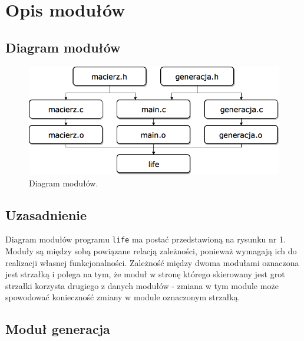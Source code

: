 \documentclass[a4paper,12pt,oneside]{article}
\begin{document}
\section{Opis modułów}

\subsection{Diagram modułów}

\begin{figure}[ht]
\centering
\includegraphics[width=1.0\textwidth]{diagram_modulow.png}
\caption{Diagram modułów.}
\label{fig:k1}
\end{figure}

\subsection{Uzasadnienie}
Diagram modułów programu \verb+life+ ma postać przedstawioną na rysunku nr 1. Moduły są między sobą powiązane relacją zależności, ponieważ wymagają ich do realizacji własnej funkcjonalności. Zależność między dwoma modułami oznaczona jest strzałką i polega na tym, że moduł w stronę którego skierowany jest grot strzałki korzysta drugiego z danych modułów - zmiana w tym module może spowodować konieczność zmiany w module oznaczonym strzałką.

\subsection{Moduł generacja}
\end{document}
